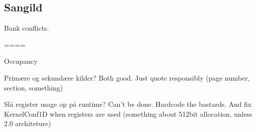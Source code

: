 \subsection*{Sangild}

Bank conflicts.

====

Occupancy

Primære og sekundære kilder? Both good. Just quote responsibly (page
number, section, something)

Slå register usage op på runtime? Can't be done. Hardcode the
bastards. And fix KernelConf1D when registers are used (something
about 512bit allocation, unless 2.0 architeture)
